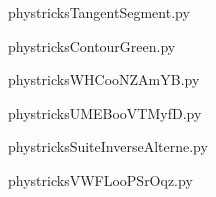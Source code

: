     \newcommand{\CaptionFigTangentSegment}{<+Type your caption here+>}
    \begin{center}
        
    \end{center}
    phystricksTangentSegment.py

    

    \clearpage
    


    \newcommand{\CaptionFigContourGreen}{<+Type your caption here+>}
    \begin{center}
        
    \end{center}
    phystricksContourGreen.py

    

    \clearpage
    


    \newcommand{\CaptionFigWHCooNZAmYB}{<+Type your caption here+>}
    \begin{center}
        
    \end{center}
    phystricksWHCooNZAmYB.py

    

    \clearpage
    


    \newcommand{\CaptionFigUMEBooVTMyfD}{<+Type your caption here+>}
    \begin{center}
        
    \end{center}
    phystricksUMEBooVTMyfD.py

    

    \clearpage
    


    \newcommand{\CaptionFigSuiteInverseAlterne}{<+Type your caption here+>}
    \begin{center}
        
    \end{center}
    phystricksSuiteInverseAlterne.py

    

    \clearpage
    


    \newcommand{\CaptionFigVWFLooPSrOqz}{<+Type your caption here+>}
    \begin{center}
        
    \end{center}
    phystricksVWFLooPSrOqz.py

